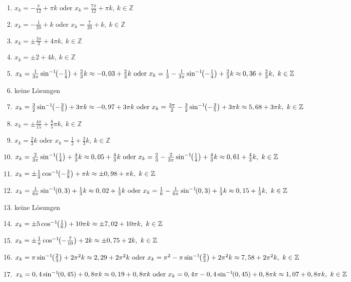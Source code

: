 \documentclass[a4paper,12pt, headsepline, ngerman]{scrartcl}
\theoremstyle{definition}
\newcommand{\arcsinn}[1]{\sin^{-1}\hspace{-3pt}\left(#1\right)}
\newcommand{\arccoss}[1]{\cos^{-1}\hspace{-3pt}\left(#1\right)}
\newcommand{\Z}{\mathbb{Z}}
\begin{document}
\begin{Answer}[ref=sincosGleichungenAllgA1]
\begin{enumerate}[label=\alph*)]
	\item \(x_k=-\frac{\pi}{12} +\pi k\text{ oder }x_k=\frac{7\pi}{12} +\pi k,\ k\in\Z\)
	\item \(x_k=-\frac{1}{20} + k\text{ oder }x_k=\frac{7}{20} + k,\ k\in\Z\)
	\item \(x_k=\pm \frac{2\pi}{3} +4\pi k,\ k\in\Z\)
	\item \(x_k=\pm 2 +4 k,\ k\in\Z\)
	\item \(x_k=\frac{1}{3\pi}\arcsinn{-\frac{1}{4}} +\frac{2}{3} k\approx -0,03+\frac{2}{3} k\text{ oder }x_k=\frac{1}{3}-\frac{1}{3\pi}\arcsinn{-\frac{1}{4}} +\frac{2}{3} k\approx 0,36+\frac{2}{3} k,\ k\in\Z\)
	\item keine Lösungen
	\item \(x_k=\frac{3}{2}\arcsinn{-\frac{3}{5}} +3\pi k\approx -0,97+3\pi k\text{ oder }x_k=\frac{3\pi}{2}-\frac{3}{2}\arcsinn{-\frac{3}{5}} +3\pi k\approx 5,68+3\pi k,\ k\in\Z\)
	\item \(x_k=\pm \frac{4\pi}{15} +\frac{8}{5}\pi k,\ k\in\Z\)
	\item \(x_k=\frac{2}{3} k\text{ oder }x_k=\frac{1}{2} +\frac{2}{3} k,\ k\in\Z\)
	\item \(x_k=\frac{2}{3\pi}\arcsinn{\frac{1}{4}} +\frac{4}{3} k\approx 0,05+\frac{4}{3} k\text{ oder }x_k=\frac{2}{3}-\frac{2}{3\pi}\arcsinn{\frac{1}{4}} +\frac{4}{3} k\approx 0,61+\frac{4}{3} k,\ k\in\Z\)
	\item \(x_k=\pm \frac{1}{2}\arccoss{-\frac{3}{8}} +\pi k\approx\pm 0,98 +\pi k,\ k\in\Z\)
	\item \(x_k=\frac{1}{6\pi}\arcsinn{0,3} +\frac{1}{3} k\approx 0,02+\frac{1}{3} k\text{ oder }x_k=\frac{1}{6}-\frac{1}{6\pi}\arcsinn{0,3} +\frac{1}{3} k\approx 0,15+\frac{1}{3} k,\ k\in\Z\)
	\item keine Lösungen
	\item \(x_k=\pm 5\arccoss{\frac{1}{6}} +10\pi k\approx\pm 7,02 +10\pi k,\ k\in\Z\)
	\item \(x_k=\pm \frac{1}{\pi}\arccoss{-\frac{7}{10}} +2k\approx\pm 0,75 +2k,\ k\in\Z\)
	\item \(x_k=\pi\arcsinn{\frac{2}{3}} +2\pi^2 k\approx 2,29+2\pi^2 k\text{ oder }x_k=\pi^2-\pi\arcsinn{\frac{2}{3}} +2\pi^2 k\approx 7,58+2\pi^2 k,\ k\in\Z\)
	\item \(x_k=0,4\arcsinn{0,45} +0,8\pi k\approx 0,19+0,8\pi k\text{ oder }x_k=0,4\pi-0,4\arcsinn{0,45} +0,8\pi k\approx 1,07+0,8\pi k,\ k\in\Z\)

\end{enumerate}
\end{Answer}
\end{document}
